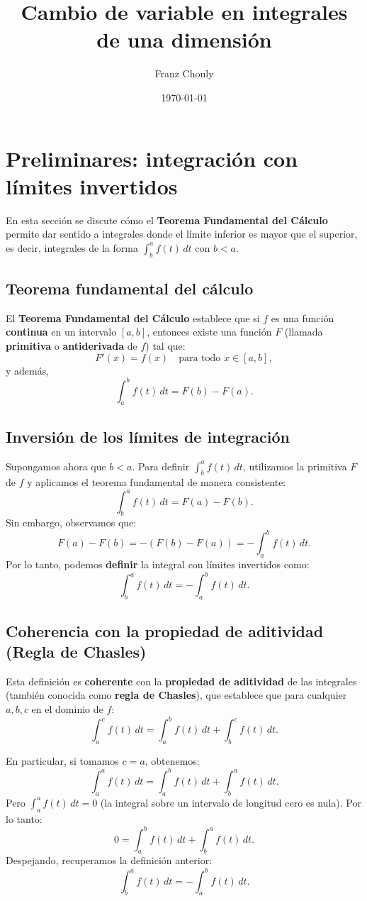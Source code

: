 \documentclass[12pt,a4paper]{article}
\title{\textbf{Cambio de variable en integrales de una dimensión}}
\author{Franz Chouly}
\date{\today}
\begin{document}
\maketitle

\section{Preliminares: integración con límites invertidos}

En esta sección se discute cómo el \textbf{Teorema Fundamental del Cálculo} permite dar sentido a integrales donde el límite inferior es mayor que el superior, es decir, integrales de la forma \(\int_b^a f(t) \, dt\) con \(b < a\).

\subsection{Teorema fundamental del cálculo}
El \textbf{Teorema Fundamental del Cálculo} establece que si \(f\) es una función \textbf{continua} en un intervalo \([a, b]\), entonces existe una función \(F\) (llamada \textbf{primitiva} o \textbf{antiderivada} de \(f\)) tal que:
\[
F'(x) = f(x) \quad \text{para todo } x \in [a, b],
\]
y además,
\[
\int_a^b f(t) \, dt = F(b) - F(a).
\]

\subsection{Inversión de los límites de integración}
Supongamos ahora que \(b < a\). Para definir \(\int_b^a f(t) \, dt\), utilizamos la primitiva \(F\) de \(f\) y aplicamos el teorema fundamental de manera consistente:
\[
\int_b^a f(t) \, dt = F(a) - F(b).
\]
Sin embargo, observamos que:
\[
F(a) - F(b) = - \left( F(b) - F(a) \right) = - \int_a^b f(t) \, dt.
\]
Por lo tanto, podemos \textbf{definir} la integral con límites invertidos como:
\[
\int_b^a f(t) \, dt = - \int_a^b f(t) \, dt.
\]

\subsection{Coherencia con la propiedad de aditividad (Regla de Chasles)}
Esta definición es \textbf{coherente} con la \textbf{propiedad de aditividad} de las integrales (también conocida como \textbf{regla de Chasles}), que establece que para cualquier \(a, b, c\) en el dominio de \(f\):
\[
\int_a^c f(t) \, dt = \int_a^b f(t) \, dt + \int_b^c f(t) \, dt.
\]

En particular, si tomamos \(c = a\), obtenemos:
\[
\int_a^a f(t) \, dt = \int_a^b f(t) \, dt + \int_b^a f(t) \, dt.
\]
Pero \(\int_a^a f(t) \, dt = 0\) (la integral sobre un intervalo de longitud cero es nula). Por lo tanto:
\[
0 = \int_a^b f(t) \, dt + \int_b^a f(t) \, dt.
\]
Despejando, recuperamos la definición anterior:
\[
\int_b^a f(t) \, dt = - \int_a^b f(t) \, dt.
\]
\end{document}
